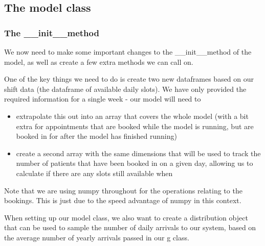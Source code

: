 \documentclass[
  letterpaper,
  DIV=11,
  numbers=noendperiod]{scrreprt}
\providecommand{\tightlist}{%
  \setlength{\itemsep}{0pt}\setlength{\parskip}{0pt}}\usepackage{longtable,booktabs,array}
\begin{document}
\subsection{The model class}\label{the-model-class-10}

\subsubsection{The \_\_init\_\_method}\label{the-__init__method}

We now need to make some important changes to the \_\_init\_\_method of
the model, as well as create a few extra methods we can call on.

One of the key things we need to do is create two new dataframes based
on our shift data (the dataframe of available daily slots). We have only
provided the required information for a single week - our model will
need to

\begin{itemize}
\tightlist
\item
  extrapolate this out into an array that covers the whole model (with a
  bit extra for appointments that are booked while the model is running,
  but are booked in for after the model has finished running)
\item
  create a second array with the same dimensions that will be used to
  track the number of patients that have been booked in on a given day,
  allowing us to calculate if there are any slots still available when
\end{itemize}

\begin{tcolorbox}[enhanced jigsaw, colframe=quarto-callout-tip-color-frame, bottomtitle=1mm, breakable, rightrule=.15mm, coltitle=black, colbacktitle=quarto-callout-tip-color!10!white, opacityback=0, leftrule=.75mm, arc=.35mm, toptitle=1mm, title=\textcolor{quarto-callout-tip-color}{\faLightbulb}\hspace{0.5em}{Tip}, titlerule=0mm, colback=white, toprule=.15mm, bottomrule=.15mm, left=2mm, opacitybacktitle=0.6]

Note that we are using numpy throughout for the operations relating to
the bookings. This is just due to the speed advantage of numpy in this
context.

\end{tcolorbox}

When setting up our model class, we also want to create a distribution
object that can be used to sample the number of daily arrivals to our
system, based on the average number of yearly arrivals passed in our g
class.
\end{document}
